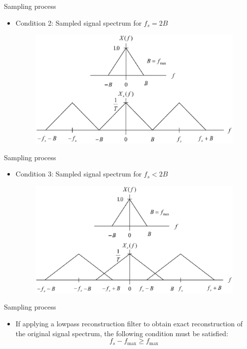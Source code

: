 \documentclass[pdflatex,compress,mathserif]{beamer}
\begin{document}
\begin{frame}{Sampling process}
    \begin{itemize}
        \item Condition 2: Sampled signal spectrum for $f_s = 2B$
        \begin{figure}
            \includegraphics[width=0.9\linewidth]{./img/img10}
        \end{figure}
    \end{itemize}
\end{frame}

\begin{frame}{Sampling process}
    \begin{itemize}
        \item Condition 3: Sampled signal spectrum for $f_s < 2B$
        \begin{figure}
            \includegraphics[width=0.9\linewidth]{./img/img11}
        \end{figure}
    \end{itemize}
\end{frame}

\begin{frame}{Sampling process}
    \begin{itemize}
        \item If applying a lowpass reconstruction filter to obtain exact reconstruction of the original signal spectrum, the following condition must be satisfied:
        \begin{equation}
            f_s - f_{\text{max}} \geq f_{\text{max}}
            \label{eq:2.12}
        \end{equation}
    \end{itemize} 
\end{frame}
\end{document}
